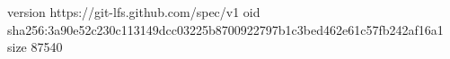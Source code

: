 version https://git-lfs.github.com/spec/v1
oid sha256:3a90e52c230c113149dcc03225b8700922797b1c3bed462e61c57fb242af16a1
size 87540
